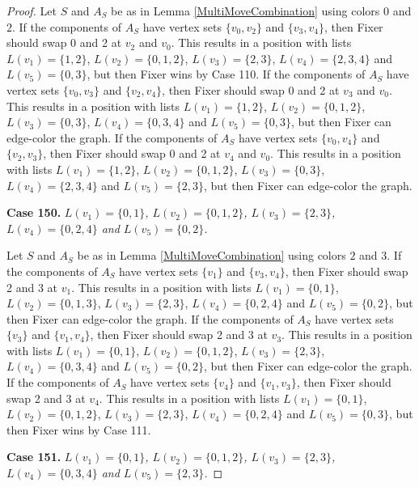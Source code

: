 \documentclass[12pt]{amsart}
\theoremstyle{plain}
\theoremstyle{definition}
\theoremstyle{remark}
\begin{document}
\begin{proof}
Let $S$ and $A_S$ be as in Lemma \ref{MultiMoveCombination} using colors $0$ and $2$. If the components of $A_S$ have vertex sets $\{v_0, v_2\}$ and $\{v_3, v_4\}$, then Fixer should swap 0 and 2 at $v_2$ and $v_0$. This results in a position with lists $L(v_1) = \{1, 2\}$, $L(v_2) = \{0, 1, 2\}$, $L(v_3) = \{2, 3\}$, $L(v_4) = \{2, 3, 4\}$ and $L(v_5) = \{0, 3\}$, but then Fixer wins by Case 110.
If the components of $A_S$ have vertex sets $\{v_0, v_3\}$ and $\{v_2, v_4\}$, then Fixer should swap 0 and 2 at $v_3$ and $v_0$. This results in a position with lists $L(v_1) = \{1, 2\}$, $L(v_2) = \{0, 1, 2\}$, $L(v_3) = \{0, 3\}$, $L(v_4) = \{0, 3, 4\}$ and $L(v_5) = \{0, 3\}$, but then Fixer can edge-color the graph.
If the components of $A_S$ have vertex sets $\{v_0, v_4\}$ and $\{v_2, v_3\}$, then Fixer should swap 0 and 2 at $v_4$ and $v_0$. This results in a position with lists $L(v_1) = \{1, 2\}$, $L(v_2) = \{0, 1, 2\}$, $L(v_3) = \{0, 3\}$, $L(v_4) = \{2, 3, 4\}$ and $L(v_5) = \{2, 3\}$, but then Fixer can edge-color the graph.

\noindent\textbf{Case 150.  }\textit{$L(v_1) = \{0, 1\}$, $L(v_2) = \{0, 1, 2\}$, $L(v_3) = \{2, 3\}$, $L(v_4) = \{0, 2, 4\}$ and $L(v_5) = \{0, 2\}$.}

Let $S$ and $A_S$ be as in Lemma \ref{MultiMoveCombination} using colors $2$ and $3$. If the components of $A_S$ have vertex sets $\{v_1\}$ and $\{v_3, v_4\}$, then Fixer should swap 2 and 3 at $v_1$. This results in a position with lists $L(v_1) = \{0, 1\}$, $L(v_2) = \{0, 1, 3\}$, $L(v_3) = \{2, 3\}$, $L(v_4) = \{0, 2, 4\}$ and $L(v_5) = \{0, 2\}$, but then Fixer can edge-color the graph.
If the components of $A_S$ have vertex sets $\{v_3\}$ and $\{v_1, v_4\}$, then Fixer should swap 2 and 3 at $v_3$. This results in a position with lists $L(v_1) = \{0, 1\}$, $L(v_2) = \{0, 1, 2\}$, $L(v_3) = \{2, 3\}$, $L(v_4) = \{0, 3, 4\}$ and $L(v_5) = \{0, 2\}$, but then Fixer can edge-color the graph.
If the components of $A_S$ have vertex sets $\{v_4\}$ and $\{v_1, v_3\}$, then Fixer should swap 2 and 3 at $v_4$. This results in a position with lists $L(v_1) = \{0, 1\}$, $L(v_2) = \{0, 1, 2\}$, $L(v_3) = \{2, 3\}$, $L(v_4) = \{0, 2, 4\}$ and $L(v_5) = \{0, 3\}$, but then Fixer wins by Case 111.

\noindent\textbf{Case 151.  }\textit{$L(v_1) = \{0, 1\}$, $L(v_2) = \{0, 1, 2\}$, $L(v_3) = \{2, 3\}$, $L(v_4) = \{0, 3, 4\}$ and $L(v_5) = \{2, 3\}$.}


\end{proof}
\end{document}
